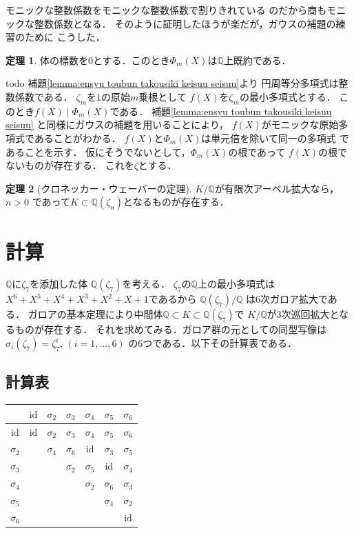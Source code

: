 \documentclass[dvipdfmx,a4paper,12pt]{jsarticle}
\makeatletter
\newcommand{\uref}[1]{\hyperref[#1]{\textcolor{TiffanyBlue}{\underline{\ref*{#1}}}}}
\theoremstyle{definition}
\newtheorem{theorem}{定理}[section]
\renewcommand{\proofname}{証明}
\renewenvironment{proof}[1][\proofname]{%
  \par\pushQED{\qed}%
  \normalfont \topsep6\p@\@plus6\p@\relax
  \trivlist
  \item[\hskip\labelsep\bfseries#1\@addpunct{.}]\ignorespaces
}{%
  \popQED\endtrivlist\@endpefalse
}
\makeatother
\begin{document}
モニックな整数係数をモニックな整数係数で割りきれている
のだから商もモニックな整数係数となる．
そのように証明したほうが楽だが，ガウスの補題の練習のために
こうした．
\begin{theorem}
    体の標数を$0$とする．このとき$\Phi_m(X)$は$\mathbb{Q}$上既約である．
\end{theorem}
\begin{proof}
    todo
    補題\uref{lemma:ensyu toubun takousiki keisuu seisuu}より
    円周等分多項式は整数係数である．
    $\zeta_m$を$1$の原始$m$乗根として
    $f(X)$を$\zeta_m$の最小多項式とする．
    このとき$f(X)\mid \Phi_m(X)$である．
    補題\uref{lemma:ensyu toubun takousiki keisuu seisuu}
    と同様にガウスの補題を用いることにより，
    $f(X)$がモニックな原始多項式であることがわかる．
    $f(X)$と$\Phi_m(X)$は単元倍を除いて同一の多項式
    であることを示す．
    仮にそうでないとして，$\Phi_m(X)$の根であって
    $f(X)$の根でないものが存在する．
    これを$\zeta$とする．
\end{proof}

\begin{theorem}[クロネッカー・ウェーバーの定理]
    $K/\mathbb{Q}$が有限次アーベル拡大なら，$n>0$
    であって$K\subset \mathbb{Q}(\zeta_n)$となるものが存在する．
\end{theorem}


\section{計算}

$\mathbb{Q}$に$\zeta_7$を添加した体
$\mathbb{Q}(\zeta_7)$を考える．
$\zeta_7$の$\mathbb{Q}$上の最小多項式は
$X^6+X^5+X^4+X^3+X^2+X+1$であるから
$\mathbb{Q}(\zeta_7)/\mathbb{Q}$
は$6$次ガロア拡大である．
ガロアの基本定理により中間体$\mathbb{Q}\subset
K \subset \mathbb{Q}(\zeta_7)$で
$K/\mathbb{Q}$が$3$次巡回拡大となるものが存在する．
それを求めてみる．ガロア群の元としての同型写像は
$\sigma_i(\zeta_7)=\zeta_7^i,\,(i=1,\ldots,6)$
の$6$つである．以下その計算表である．


\subsection*{計算表}

\begin{tabular}{c|cccccc}
   & $\mathrm{id}$ & $\sigma_2$ & $\sigma_3$ & $\sigma_4$ & $\sigma_5$ & $\sigma_6$ \\ \hline
  $\mathrm{id}$ & $\mathrm{id}$ & $\sigma_2$ & $\sigma_3$ & $\sigma_4$ & $\sigma_5$ & $\sigma_6$ \\
  $\sigma_2$ &  & $\sigma_4$ & $\sigma_6$ & $\mathrm{id}$ & $\sigma_3$ & $\sigma_5$ \\
  $\sigma_3$ &  &  & $\sigma_2$ & $\sigma_5$ & $\mathrm{id}$ & $\sigma_4$ \\
  $\sigma_4$ &  &  &  & $\sigma_2$ & $\sigma_6$ & $\sigma_3$ \\
  $\sigma_5$ &  &  &  &  & $\sigma_4$ & $\sigma_2$ \\
  $\sigma_6$ &  &  &  &  &  & $\mathrm{id}$ \\
\end{tabular}
\end{document}
